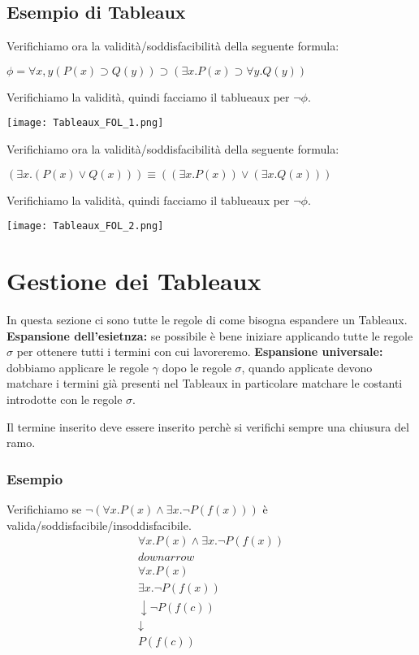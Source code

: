 \documentclass[../main.tex]{subfiles}
\newcommand{\spazio}{\vspace{1em} \newline}
\begin{document}
   \subsection{Esempio di Tableaux}
   Verifichiamo ora la validità/soddisfacibilità della seguente formula:
   \begin{center}
      $\phi =  \forall x, y(P(x) \supset Q(y))  \supset ( \exists x.P(x)  \supset  \forall y.Q(y))$
   \end{center}
   Verifichiamo la validità, quindi facciamo il tablueaux per $\lnot \phi$.
   \begin{center}
      \texttt{[image: Tableaux\_FOL\_1.png]}
   \end{center}
   \vspace{4ex}
   Verifichiamo ora la validità/soddisfacibilità della seguente formula:
   \begin{center}
      $( \exists x.(P(x)  \lor Q(x))) \equiv (( \exists x.P(x))  \lor ( \exists x.Q(x)))$
   \end{center}
   Verifichiamo la validità, quindi facciamo il tablueaux per $\lnot \phi$.
   \begin{center}
      \texttt{[image: Tableaux\_FOL\_2.png]}
   \end{center}

   \section{Gestione dei Tableaux}
   In questa sezione ci sono tutte le regole di come bisogna espandere un Tableaux.
   \spazio
   \textbf{Espansione dell'esietnza:} se possibile è bene iniziare applicando tutte le regole $\sigma$ per ottenere tutti i termini con cui lavoreremo.
   \spazio
   \textbf{Espansione universale:} dobbiamo applicare le regole $\gamma$ dopo le regole $\sigma$, quando applicate devono matchare i termini già presenti nel Tableaux in particolare matchare le costanti introdotte con le regole $\sigma$.

   Il termine inserito deve essere inserito perchè si verifichi sempre una chiusura del ramo.

   \subsubsection{Esempio}
   Verifichiamo se $\lnot (\forall x.P(x) \land \exists x. \lnot P(f(x)))$ è valida/soddisfacibile/insoddisfacibile.
   \begin{gather*}
      \forall x.P(x) \land \exists x. \lnot P(f(x))\\
      downarrow\\
      \forall x.P(x)\\
      \exists x. \lnot P(f(x))\\
      \downarrow
      \lnot P(f(c))\\
      \downarrow\\
      P(f(c))
   \end{gather*} 
\end{document}
